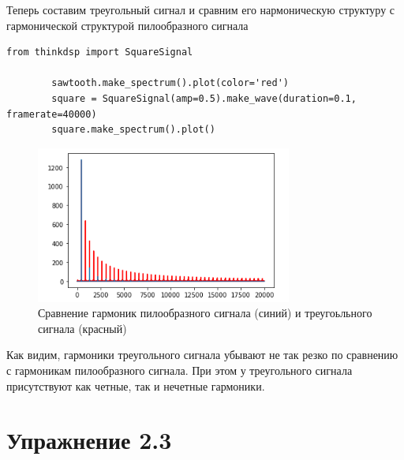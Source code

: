 \documentclass[a4paper,12pt]{article}
\begin{document}
\begin{enumerate}
	Теперь составим треугольный сигнал и сравним его нармоническую структуру с гармонической структурой пилообразного сигнала
	\begin{lstlisting}[caption=Создание треугольного сигнала]
		from thinkdsp import SquareSignal
		
		sawtooth.make_spectrum().plot(color='red')
		square = SquareSignal(amp=0.5).make_wave(duration=0.1, framerate=40000)
		square.make_spectrum().plot()
	\end{lstlisting}
	\begin{figure}[H]
		\centering
		\includegraphics[width=0.75\textwidth]{2_4.png}
		\caption{Сравнение гармоник пилообразного сигнала (синий) и треугоьльного сигнала (красный)}
		\label{fig:2.4}
	\end{figure}

	Как видим, гармоники треугольного сигнала убывают не так резко по сравнению с гармоникам пилообразного сигнала. При этом у треугольного сигнала присутствуют как четные, так и нечетные гармоники.
	
	
\end{enumerate}

\newpage

\section{Упражнение 2.3}
\end{document}
